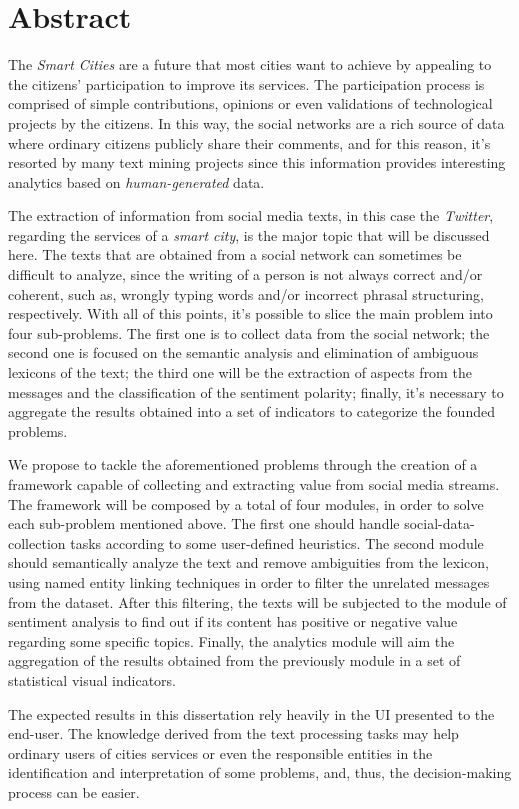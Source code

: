 \chapter*{Abstract}

The \textit{Smart Cities} are a future that most cities want to achieve by appealing to the citizens' participation to improve its services. The participation process is comprised of simple contributions, opinions or even validations of technological projects by the citizens. In this way, the social networks are a rich source of data where ordinary citizens publicly share their comments, and for this reason, it's resorted by many text mining projects since this information provides interesting analytics based on \textit{human-generated} data.

The extraction of information from social media texts, in this case the \textit{Twitter}, regarding the services of a \textit{smart city}, is the major topic that will be discussed here. The texts that are  obtained from a social network can sometimes be difficult to analyze, since the writing of a person is not always correct and/or coherent, such as, wrongly typing words and/or incorrect phrasal structuring, respectively. With all of this points, it's possible to slice the main problem into four sub-problems. The first one is to collect data from the social network; the second one is focused on the semantic analysis and elimination of ambiguous lexicons of the text; the third one will be the extraction of aspects from the messages and the classification of the sentiment polarity; finally, it's necessary to aggregate the results obtained into a set of indicators to categorize the founded problems.

We propose to tackle the aforementioned problems through the creation of a framework capable of collecting and extracting value from social media streams. The framework will be composed by a total of four modules, in order to solve each sub-problem mentioned above. The first one should handle social-data-collection tasks according to some user-defined heuristics. The second module should semantically analyze the text and remove ambiguities from the lexicon, using named entity linking techniques in order to filter the unrelated messages from the dataset. After this filtering, the texts will be subjected to the module of sentiment analysis to find out if its content has positive or negative value regarding some specific topics. Finally, the analytics module will aim the aggregation of the results obtained from the previously module in a set of statistical visual indicators.

The expected results in this dissertation rely heavily in the UI presented to the end-user. The knowledge derived from the text processing tasks may help ordinary users of cities services or even the responsible entities in the identification and interpretation of some problems, and, thus, the decision-making process can be easier.


